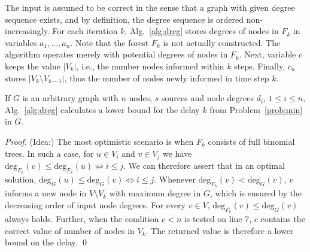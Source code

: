 The input is assumed to be correct in the sense that a graph with given degree sequence exists, and by definition, the degree sequence is ordered non-increasingly.
For each iteration $k$, Alg.~\ref{alg:dreg} stores degrees of nodes in $F_k$ in variables $a_1,\dots,a_n$.
Note that the forest $F_k$ is not actually constructed. 
The algorithm operates merely with potential degrees of nodes in $F_k$.
Next, variable $c$ keeps the value $|V_k|$, i.e., the number nodes informed within $k$ steps.
Finally, $c_n$ stores $|V_k\setminus V_{k-1}|$, thus the number of nodes newly informed in time step $k$.


\begin{proposition}
If $G$ is an arbitrary graph with $n$ nodes, $s$ sources and node degrees $d_i$, $1\leq i\leq n$, Alg.~\ref{alg:dreg} calculates a lower bound for the delay $k$ from Problem~\ref{prob:min} in $G$.
\end{proposition}
\begin{proof}
(Idea:)
The most optimistic scenario is when $F_k$ consists of full binomial trees.
In such a case, for $u\in V_i$ and $v\in V_j$ we have $\text{deg}_{F_k}(v)\leq\text{deg}_{F_k}(u)\Leftrightarrow i\leq j$.
We can therefore assert that in an optimal solution, $\text{deg}_G(u)\leq\text{deg}_G(v)\Leftrightarrow i\leq j$.
Whenever $\text{deg}_{F_k}(v)<\text{deg}_G(v)$, $v$ informs a new node in $V\setminus V_k$ with maximum degree in $G$, which is ensured by the decreasing order of input node degrees.
For every $v\in V$, $\text{deg}_{F_k}(v)\leq \text{deg}_G(v)$ always holds.
Further, when the condition $c<n$ is tested on line 7, $c$ contains the correct value of number of nodes in $V_k$.
The returned value is therefore a lower bound on the delay.
\qed
\end{proof}







